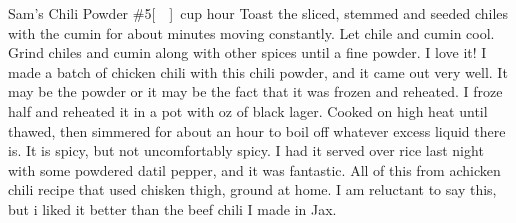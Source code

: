 \begin{recipe}{Sam's Chili Powder \#5}{\unit[]{cup}}{ hour}
Toast the sliced, stemmed and seeded chiles with the cumin for about \unit[3--4]{minutes} moving constantly.  Let chile and cumin cool.
Grind chiles and cumin along with other spices until a fine powder.
\freeform I love it!  I made a batch of chicken chili with this chili powder, and it came out very well.  It may be the powder or it may be the fact that it was frozen and reheated.  I froze half and reheated it in a pot with \unit[12]{oz} of black lager.  Cooked on high heat until thawed, then simmered for about an hour to boil off whatever excess liquid there is.  It is spicy, but not uncomfortably spicy.  I had it served over rice last night with some powdered datil pepper, and it was fantastic.  All of this from achicken chili recipe that used chisken thigh, ground at home.  I am reluctant to say this, but i liked it better than the beef chili I made in Jax.
\end{recipe}
